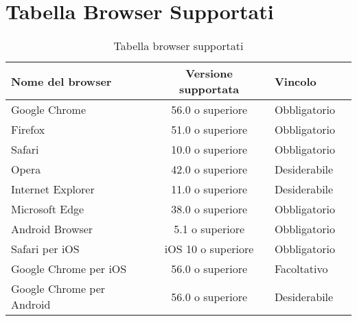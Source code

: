 \section{Tabella Browser Supportati}
\label{Tabella-browser-supportati}
\begin{table}[htbp]
	\begin{center}
		\setlength{\extrarowheight}{\jot}
		\begin{tabular}{|p{4cm}|c|p{2.5cm}|p{2.5cm}|}
			\hline
			\textbf{Nome del browser} & \textbf{Versione supportata} & \textbf{Vincolo}\\[1ex]
			\hline
			Google Chrome & 56.0 o superiore & Obbligatorio\\[1ex]
			\hline
			Firefox & 51.0 o superiore & Obbligatorio\\[1ex]
			\hline
			Safari & 10.0 o superiore & Obbligatorio\\[1ex]
			\hline
			Opera & 42.0 o superiore & Desiderabile\\[1ex]
			\hline
			Internet Explorer & 11.0 o superiore & Desiderabile \\[1ex]
			\hline
			Microsoft Edge & 38.0 o superiore & Obbligatorio \\[1ex]
			\hline
			Android Browser & 5.1 o superiore & Obbligatorio \\[1ex]
			\hline
			Safari per iOS & iOS 10 o superiore & Obbligatorio \\[1ex]
			\hline
			Google Chrome per iOS & 56.0 o superiore & Facoltativo\\[1ex]
			\hline
			Google Chrome per Android & 56.0 o superiore & Desiderabile\\[1ex]
			\hline
		\end{tabular}
	\end{center}
	\caption{Tabella browser supportati}
\end{table}
